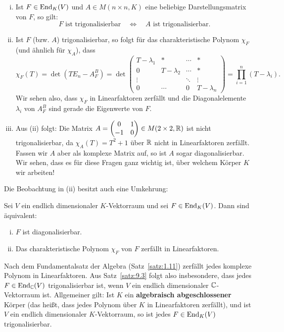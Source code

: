 \begin{bemerkung}
	\label{bem:9.2}
	\begin{enumerate}[(i)]
		\item Ist $F \in \operatorname{End}_K(V)$ und $A \in M(n \times n,K)$ eine beliebige Darstellungsmatrix von $F$, so gilt:
		\[
			F \text{ ist trigonalisierbar} \quad \Leftrightarrow \quad A \text{ ist trigonalisierbar.}
		\]
		\item Ist $F$ (bzw. $A$) trigonalisierbar, so folgt für das charakteristische Polynom $\chi_F$ (und ähnlich für $\chi_A$), dass
		\[
			\chi_F(T) = \det(TE_n-A_F^B) = \det \begin{pmatrix}
			T-\lambda_1 & * & \cdots & * \\ 
			0 & T-\lambda_2 & \cdots & * \\ 
			\vdots &  & \ddots & \vdots \\ 
			0 & \cdots & 0 & T-\lambda_n
			\end{pmatrix} = \prod\limits_{i=1}^{n} (T-\lambda_i).
		\]
		Wir sehen also, dass $\chi_F$ in Linearfaktoren zerfällt und die Diagonalelemente $\lambda_i$ von $A^B_F$ sind gerade die Eigenwerte von $F$.
		\item Aus (ii) folgt:
		Die Matrix $A = \begin{pmatrix}
			0 & 1 \\ -1 & 0
		\end{pmatrix} \in M(2 \times 2,\mathbb{R})$ ist nicht trigonalisierbar, da $\chi_A(T) = T^2 +1$ über $\mathbb{R}$ nicht in Linearfaktoren zerfällt.
		Fassen wir $A$ aber als komplexe Matrix auf, so ist $A$ sogar diagonalisierbar.
		Wir sehen, dass es für diese Fragen ganz wichtig ist, über welchem Körper $K$ wir arbeiten!
	\end{enumerate}
\end{bemerkung}
  
Die Beobachtung in (ii) besitzt auch eine Umkehrung:

\begin{satz}
	\label{satz:9.3}
	Sei $V$ ein endlich dimensionaler $K$-Vektorraum und sei $F \in \operatorname{End}_K(V)$.
	Dann sind äquivalent:
	\begin{enumerate}[(i)]
		\item	$F$ ist diagonalisierbar.
		\item Das charakteristische Polynom $\chi_F$ von $F$ zerfällt in Linearfaktoren.
	\end{enumerate}
\end{satz}

\begin{bemerkung}
	\label{bem:9.4}
	Nach dem Fundamentalsatz der Algebra (Satz~\ref{satz:1.11}) zerfällt jedes komplexe Polynom in Linearfaktoren.
	Aus Satz~\ref{satz:9.3} folgt also insbesondere, dass jedes $F \in \operatorname{End}_{\mathbb{C}}(V)$ trigonalisierbar ist, wenn $V$ ein endlich dimensionaler $\mathbb{C}$-Vektorraum ist.
	Allgemeiner gilt:
	Ist $K$ ein \textbf{algebraisch abgeschlossener} Körper (das heißt, dass jedes Polynom über $K$ in Linearfaktoren zerfällt), und ist $V$ ein endlich dimensionaler $K$-Vektorraum, so ist jedes $F \in \operatorname{End}_K(V)$ trigonalisierbar. 
\end{bemerkung}


